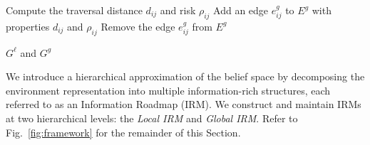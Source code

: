 \documentclass[letterpaper]{article} %
\newcommand{\ph}[1]{{\textbf{#1}:}} %
\begin{document}
\begin{algorithm}[t!]
{\begin{algorithmic}
      \STATE Compute the traversal distance $d_{ij}$ and risk $\rho_{ij}$
        \STATE Add an edge $e^g_{ij}$ to $E^g$ with properties $d_{ij}$ and $\rho_{ij}$
      \ELSE
        \STATE Remove the edge $e^g_{ij}$ from $E^g$
      \ENDIF
    \ENDFOR
  \ENDFOR



  \vspace{3pt}
  \RETURN $G^\ell$ and $G^g$

\end{algorithmic}
} %
\end{algorithm}

\noindent
We introduce a hierarchical approximation of the belief space by decomposing the environment representation into multiple information-rich structures, each referred to as an Information Roadmap (IRM). 
We construct and maintain IRMs at two hierarchical levels: the \textit{Local IRM} and \textit{Global IRM}. Refer to Fig.~\ref{fig:framework} for the remainder of this Section. 

\end{document}
